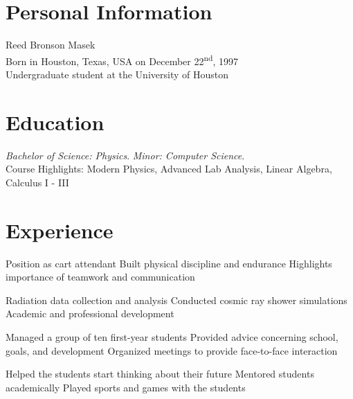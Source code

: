 \documentclass{cv_class}
\begin{document}
\subtitle{Cirriculum Vitae}

\section{Personal Information}
Reed Bronson Masek \\
Born in Houston, Texas, USA on December 22\textsuperscript{nd}, 1997 \\
Undergraduate student at the University of Houston \\

\section{Education}
\textit{Bachelor of Science: Physics}. \textit{Minor: Computer Science}. \\
Course Highlights: Modern Physics, Advanced Lab Analysis, Linear Algebra, Calculus I - III

\section{Experience}

\workitems
    {Position as cart attendant}
    {Built physical discipline and endurance}
    {Highlights importance of teamwork and communication}

\workitems
    {Radiation data collection and analysis}
    {Conducted cosmic ray shower simulations}
    {Academic and professional development}

\workitems
    {Managed a group of ten first-year students}
    {Provided advice concerning school, goals, and development}
    {Organized meetings to provide face-to-face interaction}
    
\workitems
    {Helped the students start thinking about their future}
    {Mentored students academically}
    {Played sports and games with the students}

    
\end{document}
